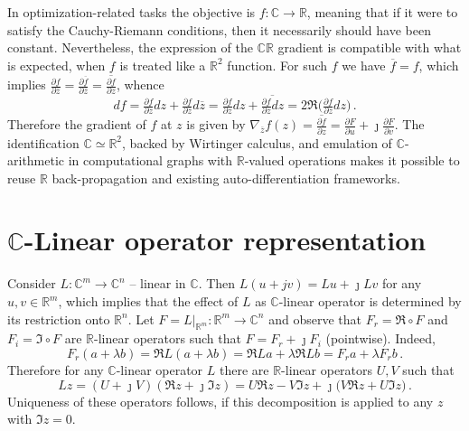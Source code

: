 \documentclass[a4paper,10pt,twocolumn]{article}
\newcommand{\real}{\mathbb{R}}
\newcommand{\cplx}{\mathbb{C}}
\newcommand{\iu}{{\jmath}}
\newcommand{\conj}[1]{\overline{#1}}
\begin{document}
In optimization-related tasks the objective is $
  f\colon \cplx\to \real
$, meaning that if it were to satisfy the Cauchy-Riemann conditions, then it necessarily
should have been constant. Nevertheless, the expression of the $\cplx\real$ gradient is
compatible with what is expected, when $f$ is treated like a $\real^2$ function. For such
$f$ we have $\conj{f} = f$, which implies $
  \tfrac{\partial f}{\partial \conj{z}}
    = \tfrac{\partial \conj{f}}{\partial \conj{z}}
    = \conj{\tfrac{\partial f}{\partial z}}
$, whence
\begin{equation*}
  df
    = \tfrac{\partial f}{\partial z} dz
      + \tfrac{\partial f}{\partial \conj{z}} d\conj{z}
    = \tfrac{\partial f}{\partial z} dz
      + \conj{\tfrac{\partial f}{\partial z} dz}
    = 2 \Re
      \bigl(
        \tfrac{\partial f}{\partial z} dz
      \bigr)
    \,.
\end{equation*}
Therefore the gradient of $f$ at $z$ is given by $
  \nabla_{\conj{z}} f(z)
    = \conj{\tfrac{\partial f}{\partial z}}
    = \tfrac{\partial F}{\partial u}
    + \iu \tfrac{\partial F}{\partial v}
$. The identification $\cplx \simeq \real^2$, backed by Wirtinger calculus, and emulation
of $\cplx$-arithmetic in computational graphs with $\real$-valued operations makes it
possible to reuse $\real$ back-propagation and existing auto-differentiation frameworks.


\section{$\cplx$-Linear operator representation} %
\label{sec:c-linear_operator_representation}

Consider $L \colon \cplx^m \to \cplx^n$ -- linear in $\cplx$. Then $
  L(u + jv) = L u + \iu L v
$ for any $u, v \in \real^m$, which implies that the effect of $L$ as $\cplx$-linear
operator is determined by its restriction onto $\real^n$. Let $
  F = L\vert_{\real^m}
  \colon \real^m \to \cplx^n
$ and observe that $F_r = \Re \circ F$ and $F_i = \Im \circ F$ are $\real$-linear operators
such that $F = F_r + \iu F_i$ (pointwise). Indeed,
$$
  F_r(a + \lambda b)
  = \Re L(a + \lambda b)
  = \Re L a + \lambda \Re L b
  = F_r a + \lambda F_r b
  \,. $$
Therefore for any $\cplx$-linear operator $L$ there are $\real$-linear operators $U, V$
such that
$$
L z 
  = (U + \iu V) (\Re z + \iu \Im z)
  = U \Re z - V \Im z + \iu \bigl( V \Re z + U \Im z \bigr)
  \,. $$
Uniqueness of these operators follows, if this decomposition is applied to any $z$ with
$\Im z = 0$.


\end{document}
